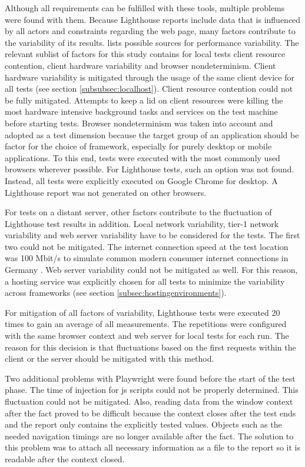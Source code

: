 \documentclass[a4paper, 12pt]{article}
\begin{document}
Although all requirements can be fulfilled with these tools, multiple problems were found with them.
Because Lighthouse reports include data that is influenced by all actors and constraints regarding the web page, many factors contribute to the variability of its results.
\cite{lighthouseVariability} lists possible sources for performance variability.
The relevant sublist of factors for this study contains for local tests client resource contention, client hardware variability and browser nondeterminism.
Client hardware variability is mitigated through the usage of the same client device for all tests (see section \ref{subsubsec:localhost}).
Client resource contention could not be fully mitigated.
Attempts to keep a lid on client resources were killing the most hardware intensive background tasks and services on the test machine before starting tests.
Browser nondeterminism was taken into account and adopted as a test dimension because the target group of an application should be factor for the choice of framework, especially for purely desktop or mobile applications.
To this end, tests were executed with the most commonly used browsers wherever possible.
For Lighthouse tests, such an option was not found.
Instead, all tests were explicitly executed on Google Chrome for desktop.
A Lighthouse report was not generated on other browsers.

For tests on a distant server, other factors contribute to the fluctuation of Lighthouse test results in addition.
Local network variability, tier-1 network variability and web server variability have to be considered for the tests.
The first two could not be mitigated.
The internet connection speed at the test location was 100 Mbit/s to simulate common modern consumer internet connections in Germany \citep{internetconnections}.
Web server variability could not be mitigated as well.
For this reason, a hosting service was explicitly chosen for all tests to minimize the variability across frameworks (see section \ref{subsec:hostingenvironments}).

For mitigation of all factors of variability, Lighthouse tests were executed 20 times to gain an average of all measurements.
The repetitions were configured with the same browser context and web server for local tests for each run.
The reason for this decision is that fluctuations based on the first requests within the client or the server should be mitigated with this method.

Two additional problems with Playwright were found before the start of the test phase.
The time of injection for \acrshort{js} scripts could not be properly determined.
This fluctuation could not be mitigated.
Also, reading data from the window context after the fact proved to be difficult because the context closes after the test ends and the report only contains the explicitly tested values.
Objects such as the needed navigation timings are no longer available after the fact.
The solution to this problem was to attach all necessary information as a file to the report so it is readable after the context closed.
\end{document}
